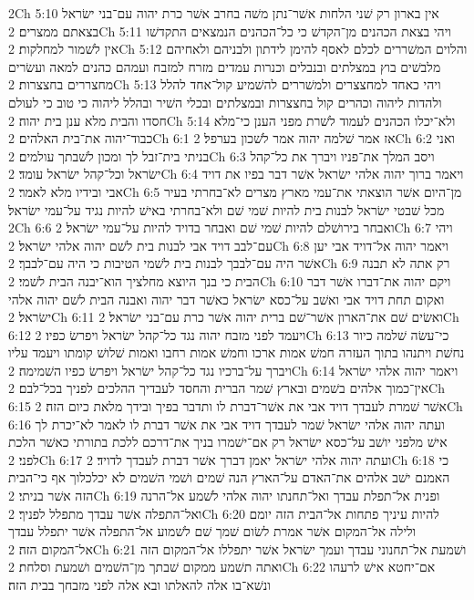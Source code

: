 2Ch 5:10  אין בארון רק שׁני הלחות אשׁר־נתן משׁה בחרב אשׁר כרת יהוה עם־בני ישׂראל בצאתם ממצרים׃
2Ch 5:11  ויהי בצאת הכהנים מן־הקדשׁ כי כל־הכהנים הנמצאים התקדשׁו אין לשׁמור למחלקות׃
2Ch 5:12  והלוים המשׁררים לכלם לאסף להימן לידתון ולבניהם ולאחיהם מלבשׁים בוץ במצלתים ובנבלים וכנרות עמדים מזרח למזבח ועמהם כהנים למאה ועשׂרים מחצררים בחצצרות׃
2Ch 5:13  ויהי כאחד למחצצרים ולמשׁררים להשׁמיע קול־אחד להלל ולהדות ליהוה וכהרים קול בחצצרות ובמצלתים ובכלי השׁיר ובהלל ליהוה כי טוב כי לעולם חסדו והבית מלא ענן בית יהוה׃
2Ch 5:14  ולא־יכלו הכהנים לעמוד לשׁרת מפני הענן כי־מלא כבוד־יהוה את־בית האלהים׃
2Ch 6:1  אז אמר שׁלמה יהוה אמר לשׁכון בערפל׃
2Ch 6:2  ואני בניתי בית־זבל לך ומכון לשׁבתך עולמים׃
2Ch 6:3  ויסב המלך את־פניו ויברך את כל־קהל ישׂראל וכל־קהל ישׂראל עומד׃
2Ch 6:4  ויאמר ברוך יהוה אלהי ישׂראל אשׁר דבר בפיו את דויד אבי ובידיו מלא לאמר׃
2Ch 6:5  מן־היום אשׁר הוצאתי את־עמי מארץ מצרים לא־בחרתי בעיר מכל שׁבטי ישׂראל לבנות בית להיות שׁמי שׁם ולא־בחרתי באישׁ להיות נגיד על־עמי ישׂראל׃
2Ch 6:6  ואבחר בירושׁלם להיות שׁמי שׁם ואבחר בדויד להיות על־עמי ישׂראל׃
2Ch 6:7  ויהי עם־לבב דויד אבי לבנות בית לשׁם יהוה אלהי ישׂראל׃
2Ch 6:8  ויאמר יהוה אל־דויד אבי יען אשׁר היה עם־לבבך לבנות בית לשׁמי הטיבות כי היה עם־לבבך׃
2Ch 6:9  רק אתה לא תבנה הבית כי בנך היוצא מחלציך הוא־יבנה הבית לשׁמי׃
2Ch 6:10  ויקם יהוה את־דברו אשׁר דבר ואקום תחת דויד אבי ואשׁב על־כסא ישׂראל כאשׁר דבר יהוה ואבנה הבית לשׁם יהוה אלהי ישׂראל׃
2Ch 6:11  ואשׂים שׁם את־הארון אשׁר־שׁם ברית יהוה אשׁר כרת עם־בני ישׂראל׃
2Ch 6:12  ויעמד לפני מזבח יהוה נגד כל־קהל ישׂראל ויפרשׂ כפיו׃
2Ch 6:13  כי־עשׂה שׁלמה כיור נחשׁת ויתנהו בתוך העזרה חמשׁ אמות ארכו וחמשׁ אמות רחבו ואמות שׁלושׁ קומתו ויעמד עליו ויברך על־ברכיו נגד כל־קהל ישׂראל ויפרשׂ כפיו השׁמימה׃
2Ch 6:14  ויאמר יהוה אלהי ישׂראל אין־כמוך אלהים בשׁמים ובארץ שׁמר הברית והחסד לעבדיך ההלכים לפניך בכל־לבם׃
2Ch 6:15  אשׁר שׁמרת לעבדך דויד אבי את אשׁר־דברת לו ותדבר בפיך ובידך מלאת כיום הזה׃
2Ch 6:16  ועתה יהוה אלהי ישׂראל שׁמר לעבדך דויד אבי את אשׁר דברת לו לאמר לא־יכרת לך אישׁ מלפני יושׁב על־כסא ישׂראל רק אם־ישׁמרו בניך את־דרכם ללכת בתורתי כאשׁר הלכת לפני׃
2Ch 6:17  ועתה יהוה אלהי ישׂראל יאמן דברך אשׁר דברת לעבדך לדויד׃
2Ch 6:18  כי האמנם ישׁב אלהים את־האדם על־הארץ הנה שׁמים ושׁמי השׁמים לא יכלכלוך אף כי־הבית הזה אשׁר בניתי׃
2Ch 6:19  ופנית אל־תפלת עבדך ואל־תחנתו יהוה אלהי לשׁמע אל־הרנה ואל־התפלה אשׁר עבדך מתפלל לפניך׃
2Ch 6:20  להיות עיניך פתחות אל־הבית הזה יומם ולילה אל־המקום אשׁר אמרת לשׂום שׁמך שׁם לשׁמוע אל־התפלה אשׁר יתפלל עבדך אל־המקום הזה׃
2Ch 6:21  ושׁמעת אל־תחנוני עבדך ועמך ישׂראל אשׁר יתפללו אל־המקום הזה ואתה תשׁמע ממקום שׁבתך מן־השׁמים ושׁמעת וסלחת׃
2Ch 6:22  אם־יחטא אישׁ לרעהו ונשׁא־בו אלה להאלתו ובא אלה לפני מזבחך בבית הזה׃

